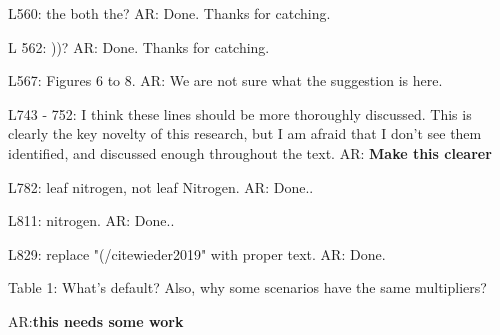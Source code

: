 \documentclass{article}
\begin{document}
L560: the both the? 
\textsf{AR: Done. Thanks for catching.} 
 
L 562: ))? 
\textsf{AR: Done. Thanks for catching.} 

L567: Figures 6 to 8. 
\textsf{AR: We are not sure what the suggestion is here. }

L743 - 752: I think these lines should be more thoroughly discussed. This is clearly the key novelty of this research, but I am afraid that I don't see them identified, and discussed enough throughout the text. 
\textsf{AR: \textbf{Make this clearer}}

L782: leaf nitrogen, not leaf Nitrogen. 
\textsf{AR: Done..} 

L811: nitrogen. 
\textsf{AR: Done..} 

L829: replace "(/citewieder2019" with proper text. 
\textsf{AR: Done.} 

Table 1: What's default? Also, why some scenarios have the same multipliers? 

\textsf{AR:\textbf{this needs some work} }
\end{document}
